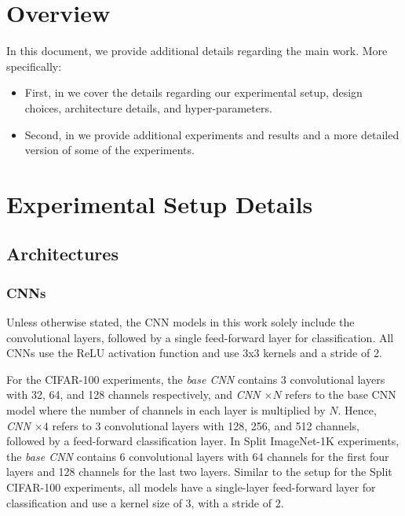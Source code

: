 \newpage
\appendix
\onecolumn

\section*{Overview}
In this document, we provide additional details regarding the main work. More specifically:
\begin{itemize}
    \item First, in  we cover the details regarding our experimental setup, design choices, architecture details, and hyper-parameters.
    \item Second, in  we provide additional experiments and results and a more detailed version of some of the experiments.
\end{itemize}


\section{Experimental Setup Details}
\label{sec:appendix-setup-details}

\subsection{Architectures}
\subsubsection{CNNs}
Unless otherwise stated, the CNN models in this work solely include the convolutional layers, followed by a single feed-forward layer for classification. All CNNs use the ReLU activation function and use 3x3 kernels and a stride of 2. 

For the CIFAR-100 experiments, the \emph{base CNN} contains 3 convolutional layers with 32, 64, and 128 channels respectively, and \emph{CNN $\times N$} refers to the base CNN model where the number of channels in each layer is multiplied by $N$. Hence, \emph{CNN $\times 4$} refers to 3 convolutional layers with 128, 256, and 512 channels, followed by a feed-forward classification layer. In Split ImageNet-1K experiments, the \emph{base CNN} contains 6 convolutional layers with 64 channels for the first four layers and 128 channels for the last two layers. Similar to the setup for the Split CIFAR-100 experiments, all models have a single-layer feed-forward layer for classification and use a kernel size of 3, with a stride of 2. 

